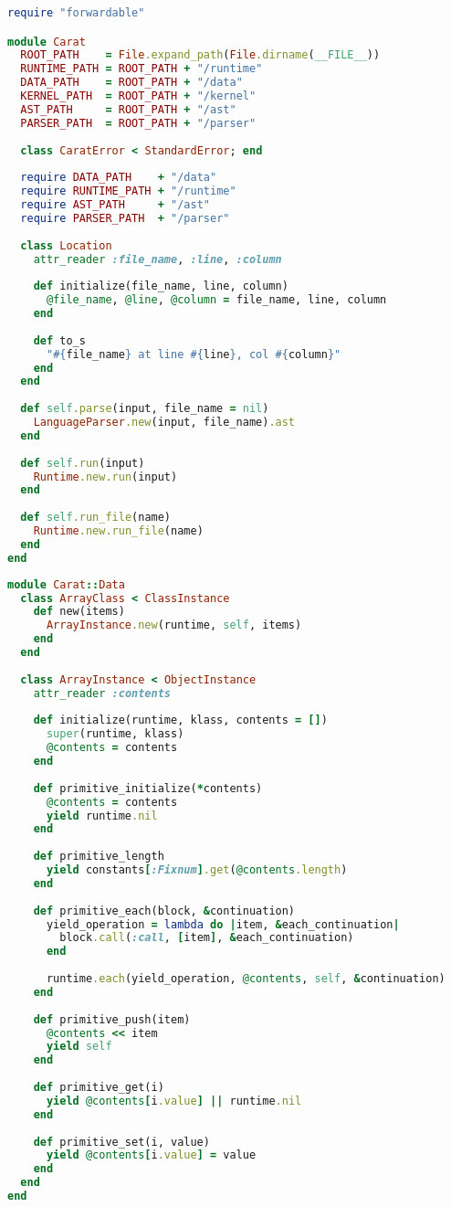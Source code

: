 \begin{lstlisting}[title={\small\Helvetica carat.rb},language=Ruby]
require "forwardable"

module Carat
  ROOT_PATH    = File.expand_path(File.dirname(__FILE__))
  RUNTIME_PATH = ROOT_PATH + "/runtime"
  DATA_PATH    = ROOT_PATH + "/data"
  KERNEL_PATH  = ROOT_PATH + "/kernel"
  AST_PATH     = ROOT_PATH + "/ast"
  PARSER_PATH  = ROOT_PATH + "/parser"
  
  class CaratError < StandardError; end
  
  require DATA_PATH    + "/data"
  require RUNTIME_PATH + "/runtime"
  require AST_PATH     + "/ast"
  require PARSER_PATH  + "/parser"
  
  class Location
    attr_reader :file_name, :line, :column
    
    def initialize(file_name, line, column)
      @file_name, @line, @column = file_name, line, column
    end
    
    def to_s
      "#{file_name} at line #{line}, col #{column}"
    end
  end
  
  def self.parse(input, file_name = nil)
    LanguageParser.new(input, file_name).ast
  end
  
  def self.run(input)
    Runtime.new.run(input)
  end
  
  def self.run_file(name)
    Runtime.new.run_file(name)
  end
end

\end{lstlisting}
\begin{lstlisting}[title={\small\Helvetica data/array.rb},language=Ruby]
module Carat::Data
  class ArrayClass < ClassInstance
    def new(items)
      ArrayInstance.new(runtime, self, items)
    end
  end
  
  class ArrayInstance < ObjectInstance
    attr_reader :contents
    
    def initialize(runtime, klass, contents = [])
      super(runtime, klass)
      @contents = contents
    end
    
    def primitive_initialize(*contents)
      @contents = contents
      yield runtime.nil
    end
    
    def primitive_length
      yield constants[:Fixnum].get(@contents.length)
    end
    
    def primitive_each(block, &continuation)
      yield_operation = lambda do |item, &each_continuation|
        block.call(:call, [item], &each_continuation)
      end
      
      runtime.each(yield_operation, @contents, self, &continuation)
    end
    
    def primitive_push(item)
      @contents << item
      yield self
    end
    
    def primitive_get(i)
      yield @contents[i.value] || runtime.nil
    end
    
    def primitive_set(i, value)
      yield @contents[i.value] = value
    end
  end
end

\end{lstlisting}
